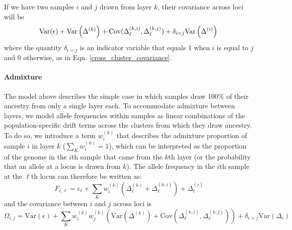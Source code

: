 \documentclass[12pt]{article}
\begin{document}
If we have two samples $i$ and $j$ drawn from layer $k$, 
their covariance across loci will be 
\begin{equation}
\text{Var}(\epsilon) +  \text{Var}\left( \Delta^{(k)} \right) +
\text{Cov}(\Delta^{(k,i)}_{\ell},\Delta^{(k,j)}_{\ell}) + \delta_{i=j} \text{Var}\left( \Delta^{(i)} \right)\ \\
\end{equation}
where the quantity $\delta_{i=j}$ is an indicator variable that equals 1 when $i$ is equal to $j$ and 0 otherwise, 
as in Eqn. \eqref{cross_cluster_covariance}.

\paragraph{Admixture} 
The model above describes the simple case 
in which samples draw 100\% of their ancestry from only a single layer each. 
To accommodate admixture between layers, 
we model allele frequencies within samples as linear combinations of the population-specific 
drift terms across the clusters from which they draw ancestry.
To do so, we introduce a term $w^{(k)}_{i}$ that describes the
admixture proportion of sample $i$ in layer $k$ ($\sum_{K}w^{(k)}_{i} = 1$),
which can be interpreted as the proportion of the genome in the $i$th
sample that came from the $k$th layer 
(or the probability that an allele at a locus is drawn from $k$).
The allele frequency in the $i$th sample at the $\ell$th locus can therefore be written as:
\begin{equation}
F_{i,\ell} = \epsilon_{\ell} + \sum\limits_{K} w^{(k)}_{i}\left( 
  \Delta^{(k)}_{\ell} + \Delta^{(k,i)}_{\ell}\right) + \Delta^{(i)}_{\ell}	
\label{drift_terms_admix}
\end{equation}
and the covariance between $i$ and $j$ across loci is
\begin{equation}
\Omega_{i,j} = \text{Var}(\epsilon) + \sum\limits_K w^{(k)}_iw^{(k)}_j
\left(
  \text{Var}\left( \Delta^{(k)} \right) +
\text{Cov}(\Delta^{(k,i)}_{\ell},\Delta^{(k,j)}_{\ell}) 	\right) +
\delta_{i=j} \text{Var}(\Delta_i)
\label{admixed_spatial_cov}
\end{equation}
\end{document}
